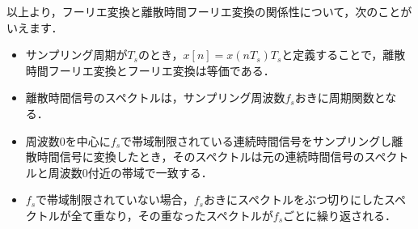 以上より，フーリエ変換と離散時間フーリエ変換の関係性について，次のことがいえます．
\begin{itemize}
\item サンプリング周期が$T_s$のとき，$x[n]=x(nT_s)T_s$と定義することで，離散時間フーリエ変換とフーリエ変換は等価である．
\item 離散時間信号のスペクトルは，サンプリング周波数$f_s$おきに周期関数となる．
\item 周波数0を中心に$f_s$で帯域制限されている連続時間信号をサンプリングし離散時間信号に変換したとき，そのスペクトルは元の連続時間信号のスペクトルと周波数0付近の帯域で一致する．
\item $f_s$で帯域制限されていない場合，$f_s$おきにスペクトルをぶつ切りにしたスペクトルが全て重なり，その重なったスペクトルが$f_s$ごとに繰り返される．
\end{itemize}

